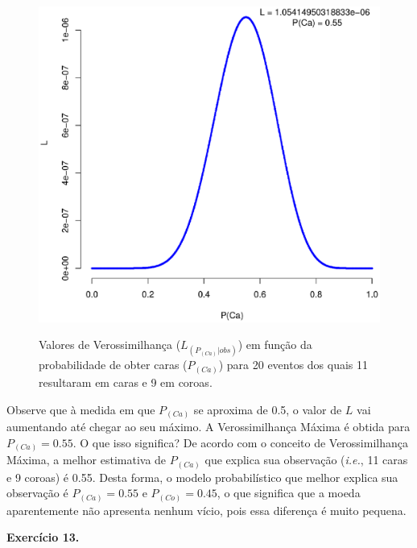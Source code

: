 \begin{refsection}
  \begin{figure}[h!]
       \centering
      {\includegraphics[scale=0.55]{figures/tut12/plot_1.eps}}
      {\caption{Valores de Verossimilhança ($L_{(P_{(Ca)}|obs)}$) em função da probabilidade de obter caras ($P_{(Ca)}$) para 20 eventos dos quais 11 resultaram em caras e 9 em coroas.}\label{fig:plot1}}
  \end{figure}


Observe que à medida em que $P_{(Ca)}$ se aproxima de 0.5, o valor de $L$ vai aumentando até chegar ao seu máximo. A Verossimilhança Máxima é obtida para $P_{(Ca)} = 0.55$. O que isso significa? De acordo com o conceito de Verossimilhança Máxima, a melhor estimativa de $P_{(Ca)}$ que explica sua observação (\textit{i.e.}, 11 caras e 9 coroas) é 0.55. Desta forma, o modelo probabilístico que melhor explica sua observação é $P_{(Ca)} = 0.55$ e $P_{(Co)} = 0.45$, o que significa que a moeda aparentemente não apresenta nenhum vício, pois essa diferença é muito pequena.\\

\begin{blackBlock}{\textbf{Exercício 13.}}\label{tut12:ex:13.1}


\end{blackBlock}
\end{refsection}
